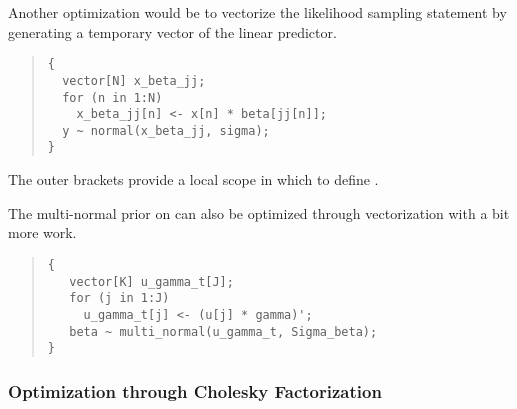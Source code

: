 Another optimization would be to vectorize the likelihood sampling
statement by generating a temporary vector of the linear predictor.
%
\begin{quote}
\begin{Verbatim}
{
  vector[N] x_beta_jj;
  for (n in 1:N)
    x_beta_jj[n] <- x[n] * beta[jj[n]];
  y ~ normal(x_beta_jj, sigma);
}
\end{Verbatim}
\end{quote}
%
The outer brackets provide a local scope in which to define
.  

The multi-normal prior on  can also be optimized through
vectorization with a bit more work.  
%
\begin{quote}
\begin{Verbatim}
{
   vector[K] u_gamma_t[J];
   for (j in 1:J)
     u_gamma_t[j] <- (u[j] * gamma)';
   beta ~ multi_normal(u_gamma_t, Sigma_beta);
}
\end{Verbatim}
\end{quote}

\subsubsection{Optimization through Cholesky Factorization}

